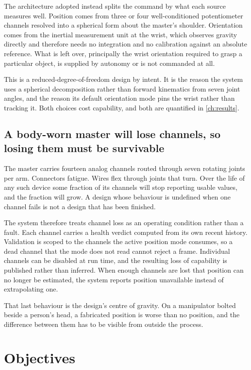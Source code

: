 The architecture adopted instead splits the command by what each source
measures well. Position comes from three or four well-conditioned
potentiometer channels resolved into a spherical form about the master's
shoulder. Orientation comes from the inertial measurement unit at the wrist,
which observes gravity directly and therefore needs no integration and no
calibration against an absolute reference. What is left over, principally the
wrist orientation required to grasp a particular object, is supplied by
autonomy or is not commanded at all.

This is a reduced-degree-of-freedom design by intent. It is the reason the
system uses a spherical decomposition rather than forward kinematics from
seven joint angles, and the reason its default orientation mode pins the wrist
rather than tracking it. Both choices cost capability, and both are quantified
in \cref{ch:results}.

\subsection{A body-worn master will lose channels, so losing them must be
survivable}

The master carries fourteen analog channels routed through seven rotating
joints per arm. Connectors fatigue. Wires flex through joints that turn. Over
the life of any such device some fraction of its channels will stop reporting
usable values, and the fraction will grow. A design whose behaviour is
undefined when one channel fails is not a design that has been finished.

The system therefore treats channel loss as an operating condition rather than
a fault. Each channel carries a health verdict computed from its own recent
history. Validation is scoped to the channels the active position mode
consumes, so a dead channel that the mode does not read cannot reject a frame.
Individual channels can be disabled at run time, and the resulting loss of
capability is published rather than inferred. When enough channels are lost
that position can no longer be estimated, the system reports position
unavailable instead of extrapolating one.

That last behaviour is the design's centre of gravity. On a manipulator bolted
beside a person's head, a fabricated position is worse than no position, and
the difference between them has to be visible from outside the process.

\section{Objectives}

